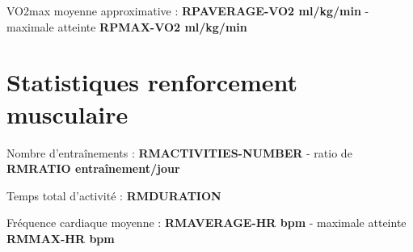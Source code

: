 \documentclass[a4paper,french,11pt]{report}
\begin{document}
\textbullet VO2max moyenne approximative : \textbf{RPAVERAGE-VO2 ml/kg/min} -
maximale atteinte \textbf{RPMAX-VO2 ml/kg/min}


\section*{Statistiques renforcement musculaire}
\thispagestyle{empty}


\textbullet Nombre d'entraînements : \textbf{RMACTIVITIES-NUMBER} -
ratio de \textbf{RMRATIO entraînement/jour}

\textbullet Temps total d'activité : \textbf{RMDURATION}

\textbullet Fréquence cardiaque moyenne : \textbf{RMAVERAGE-HR bpm} -
maximale atteinte \textbf{RMMAX-HR bpm}

\end{document}
